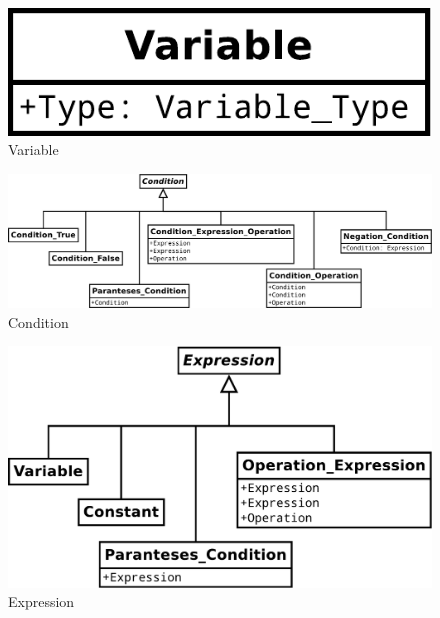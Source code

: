 \begin{figure}[h]
	\centering
	\includegraphics[scale=.3]{../fig/Variable}
	\caption{Variable}
	\label{fig:variable}
\end{figure}

\begin{figure}[h]
	\centering
	\includegraphics[scale=.3]{../fig/Condition}
	\caption{Condition}
	\label{fig:condition}
\end{figure}

\begin{figure}[h]
	\centering
	\includegraphics[scale=.3]{../fig/Expression}
	\caption{Expression}
	\label{fig:expression}
\end{figure}

